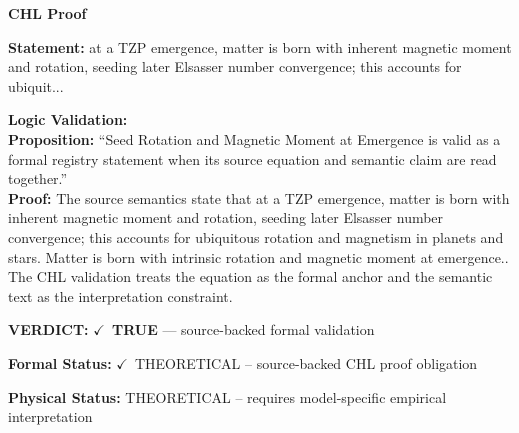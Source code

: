 \vspace{0.45em}
\noindent\textbf{CHL Proof}\par
\textbf{Statement:} at a TZP emergence, matter is born with inherent magnetic moment and rotation, seeding
later Elsasser number convergence; this accounts for ubiquit...

\textbf{Logic Validation:}\\
\textbf{Proposition:} ``Seed Rotation and Magnetic Moment at Emergence is valid as a formal registry statement
when its source equation and semantic claim are read together.''\\
\textbf{Proof:} The source semantics state that at a TZP emergence, matter is born with inherent
magnetic moment and rotation, seeding later Elsasser number convergence; this accounts
for ubiquitous rotation and magnetism in planets and stars. Matter is born with
intrinsic rotation and magnetic moment at emergence.. The CHL validation treats the
equation as the formal anchor and the semantic text as the interpretation constraint.

\textbf{VERDICT:} \ensuremath{\checkmark}\ \textbf{TRUE} --- source-backed formal validation

\textbf{Formal Status:} \ensuremath{\checkmark}\ THEORETICAL -- source-backed CHL proof obligation

\textbf{Physical Status:} THEORETICAL -- requires model-specific empirical interpretation
\par\vspace{0.45em}
\par
\ifTZPDarkEdition
{}
\fi
\endgroup
\endgroup
